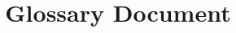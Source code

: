 \documentclass{article}
\title{\projectname Glossary Document}
\date{\docdate}
\author{\authorname}
\begin{document}
\maketitle
\newpage

\printglossary

\glsaddall
\end{document}
